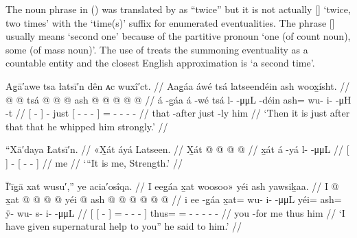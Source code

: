 The noun phrase  in (\lastx) was translated by \citeauthor{swanton:1909} as “twice” but it is not actually  [] ‘twice, two times’ with the  ‘time(s)’ suffix for enumerated eventualities.
The phrase  [] usually means ‘second one’ because of the partitive pronoun  ‘one (of count noun), some (of mass noun)’.
The use of  treats the summoning eventuality as a countable entity and the closest English approximation is ‘a second time’.

\ex\label{ex:93-32-beat-him-strongly}%
%
\begingl
	\glpreamble	Ag̣ā′awe tsa łatsī′n dên ᴀc wuxî′ct. //
	\glpreamble	Aag̱áa áwé tsá latseendéin ash woox̱ísht. //
	\gla	{}  @ {} {}  @ {} tsá
		{}  @ {} @ {} @ {} {}
		ash @  @ {} @ {} @ {} @ {} //
	\glb	{} á -g̱áa {} á -wé tsá
		{} l-  -μμL -déin {}
		ash= wu- i-  -μH -t //
	\glc	{}[  - {}]  - just
		{}[ -  - - {}]
		= - -  - - //
	\gld	{} that -after {}  {} just
		{}  {} {} -ly {}
		him  {} {} {} {} //
	\glft	‘Then it is just after that that he whipped him strongly.’
		//
\endgl
\xe

\ex\label{ex:93-33-i-am-strength}%
%
\begingl
	\glpreamble	“Xā′daya Łatsī′n. //
	\glpreamble	«\!X̱át áyá Latseen. //
	\gla	{} X̱át {}  @ {}
		{}  @ {} @ {} @ {} {} //
	\glb	{} x̱át {} á -yá
		{} l-  -μμL {} {} //
	\glc	{}[  {}]  -
		{}[ -  - \· {}] //
	\gld	{} me {}  {}
		{}  {} {} {} {} //
	\glft	‘“It is me, Strength.’
		//
\endgl
\xe

\ex\label{ex:93-34-i-will-help-you-he-said}%
%
\begingl
	\glpreamble	Ī′īg̣ā xat wusu′,” ye acia′osîqa. //
	\glpreamble	I eeg̱áa x̱at woosoo\!» yéi ash yawsiḵaa. //
	\gla	{} {} I  @ {} {}
			x̱at @  @ {} @ {} @ {} {}
		yéi @ ash @  @ {} @ {} @ {} @ {} @ {} //
	\glb	{} {} i ee -g̱áa {}
			x̱at= wu- i-  -μμL {}
		yéi= ash= ÿ- wu- s- i-  -μμL //
	\glc	{}[ {}[   - {}]
			= - -  - {}]
		thus= = - - - -  - //
	\gld	{} {} you {} -for {}
			me  {} {} {} {}
		thus him  {} {} {} {} {} //
	\glft	‘I have given supernatural help to you” he said to him.’
		//
\endgl
\xe

